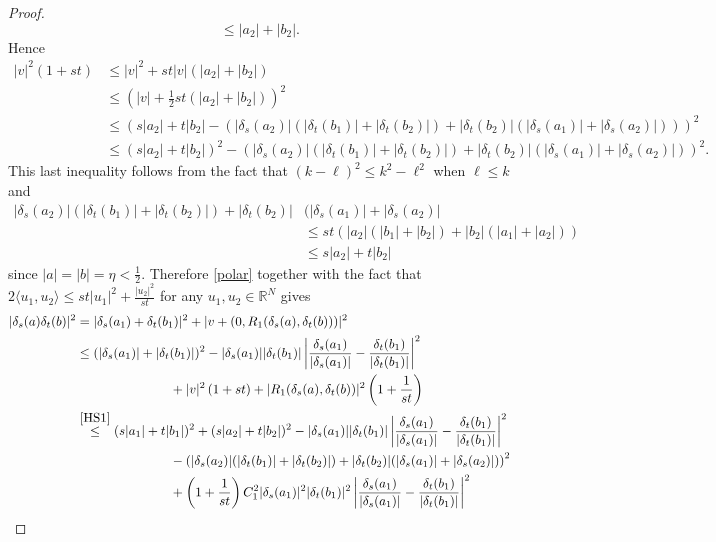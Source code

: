 \documentclass[11pt]{amsart}
\theoremstyle{definition}
\numberwithin{theorem}{section} \numberwithin{equation}{section}
\begin{document}
\begin{proof}
$$\leq |a_2|+ |b_2|.
$$
Hence
\begin{align*}
|v|^2  \left( 1+st \right) &\leq |v|^2 + st |v| \left(|a_2|+ |b_2|\right) \\
&\leq (|v| + \tfrac12 st \left(|a_2|+ |b_2|\right) )^2 \\
&\leq (s|a_2|+t|b_2|- \left( |\delta_s (a_2)|(|\delta_{t}(b_1)|+|\delta_{t}(b_2)|) + |\delta_{t}(b_2)|(|\delta_s (a_1)| + |\delta_s (a_2)|) \right)  )^2 \\
&\leq (s|a_2|+t|b_2|)^2 - \left( |\delta_s (a_2)|(|\delta_{t}(b_1)|+|\delta_{t}(b_2)|) + |\delta_{t}(b_2)|(|\delta_s (a_1)| + |\delta_s (a_2)|) \right)^2.
\end{align*}
This last inequality follows from the fact that $(k-\ell)^2 \leq k^2 - \ell^2$ when $\ell \leq k$ and
\begin{align*}
|\delta_s (a_2)|(|\delta_{t}(b_1)|+|\delta_{t}(b_2)|) + |\delta_{t}(b_2)|&(|\delta_s (a_1)| + |\delta_s (a_2)| \\
&\leq st\left( |a_2|(|b_1|+|b_2|) + |b_2|(|a_1| + |a_2|) \right) \\
&\leq s|a_2|+t|b_2|
\end{align*}
since $|a|=|b|=\eta < \frac12$.
Therefore %
\eqref{polar} together with the fact that $2\langle u_1,u_2 \rangle \leq st|u_1|^2 + \frac{|u_2|^2}{st}$ for any $u_1,u_2 \in \mathbb{R}^N$ gives
\begin{align*}
|\delta_s (a) \delta_{t}(b)|^2
&= |\delta_s (a_1) + \delta_{t}(b_1)|^2 + |v+(0,R_1(\delta_s (a), \delta_{t}(b)))|^2 \\
&\leq (|\delta_s (a_1)| + |\delta_{t}(b_1)|)^2 
-|\delta_s (a_1)||\delta_{t} (b_1)|
\left| \frac{\delta_s (a_1)}{|\delta_s (a_1)|} - \frac{\delta_{t} (b_1)}{|\delta_{t} (b_1)|} \right|^2 \\
& \hspace{1in} + |v|^2\left( 1+st \right)
+ |R_1(\delta_s (a), \delta_{t}(b))|^2 \left(1+ \frac{1}{st} \right) \\
& \stackrel{\eqref{HS1}}{\leq} (s|a_1| + t|b_1|)^2 + (s|a_2| + t|b_2|)^2
- |\delta_s (a_1)||\delta_{t} (b_1)|
\left| \frac{\delta_s (a_1)}{|\delta_s (a_1)|} - \frac{\delta_{t} (b_1)}{|\delta_{t} (b_1)|} \right|^2 \\
& \hspace{1in} - \left( |\delta_s (a_2)|(|\delta_{t}(b_1)|+|\delta_{t}(b_2)|) + |\delta_{t}(b_2)|(|\delta_s (a_1)| + |\delta_s (a_2)|) \right)^2\\
& \hspace{1in} +  \left(1+ \frac{1}{st} \right) C_1^2 |\delta_s (a_1)|^2 |\delta_{t} (b_1)|^2 \left| \frac{\delta_s (a_1)}{|\delta_s (a_1)|} - \frac{\delta_{t} (b_1)}{|\delta_{t} (b_1)|} \right|^2

\end{align*}
\end{proof}
\end{document}
